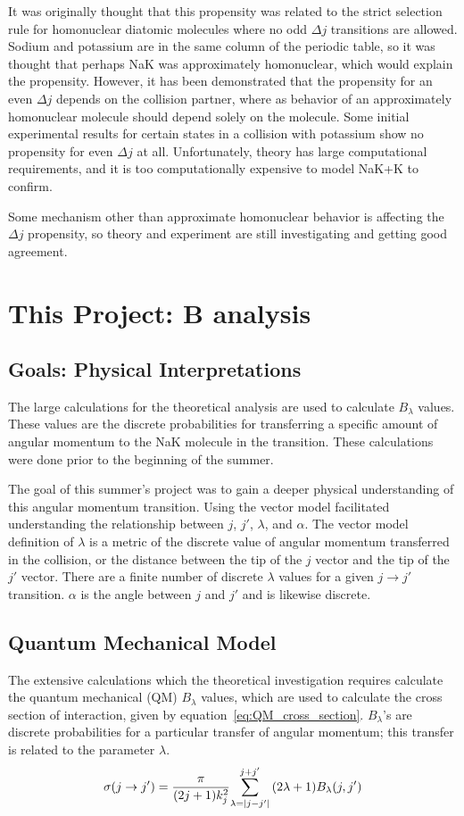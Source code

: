 \documentclass[letterpaper,titlepage,12pt]{article}
\begin{document}
It was originally thought that this propensity was related to the strict
selection rule for homonuclear diatomic molecules where no odd \(\Delta j\)
transitions are allowed.  Sodium and potassium are in the same column of the
periodic table, so it was thought that perhaps NaK was approximately
homonuclear, which would explain the propensity.  However, it has been
demonstrated that the propensity for an even \(\Delta j\) depends on the collision
partner, where as behavior of an approximately homonuclear molecule should
depend solely on the molecule.  Some initial experimental results for certain
states in a collision with potassium show no propensity for even \(\Delta j\) at
all.  Unfortunately, theory has large computational requirements, and it is too
computationally expensive to model NaK+K to confirm.

Some mechanism other than approximate homonuclear behavior is affecting the
\(\Delta j\) propensity, so theory and experiment are still investigating and
getting good agreement.

\section{This Project: B analysis}
\subsection{Goals: Physical Interpretations}
The large calculations for the theoretical analysis are used to calculate
\(B_\lambda\) values.  These values are the discrete probabilities for transferring
a specific amount of angular momentum to the NaK molecule in the transition.
These calculations were done prior to the beginning of the summer.

The goal of this summer's project was to gain a deeper physical understanding
of this angular momentum transition.  Using the vector model facilitated
understanding the relationship between \(j\), \(j'\), \(\lambda\), and \(\alpha\).  The vector
model definition of \(\lambda\) is a metric of the discrete value of angular
momentum transferred in the collision, or the distance between the tip of the
\(j\) vector and the tip of the \(j'\) vector.  There are a finite number of discrete
\(\lambda\) values for a given \(j\rightarrow j'\) transition.  \(\alpha\) is the angle between 
\(j\) and \(j'\) and is likewise discrete.

\newpage
\subsection{Quantum Mechanical Model}
The extensive calculations which the theoretical investigation requires
calculate the quantum mechanical (QM) \(B_\lambda\) values, which are used to
calculate the cross section of interaction, given by equation~\ref{eq:QM_cross_section}.
\(B_\lambda\)'s are discrete probabilities for a particular transfer of angular
momentum; this transfer is related to the parameter \(\lambda\).  
\begin{equation}
    \sigma(j\rightarrow j')={{\pi}\over{(2j+1)k_j^2}}{\sum_{\lambda=\lvert j-j'\rvert}^{j+j'} {(2\lambda+1)B_\lambda(j,j')}}
    \label{eq:QM_cross_section}
\end{equation}
\end{document}
